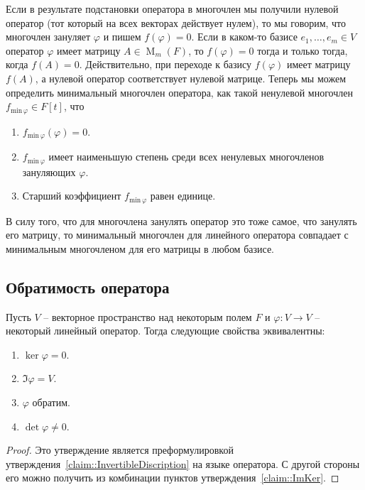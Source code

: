 Если в результате подстановки оператора в многочлен мы получили нулевой оператор (тот который на всех векторах действует нулем), то мы говорим, что многочлен зануляет $\varphi$ и пишем $f(\varphi) = 0$.
Если в каком-то базисе $e_1,\ldots,e_m\in V$ оператор $\varphi$ имеет матрицу $A\in \operatorname{M}_{m}(F)$, то $f(\varphi) = 0$ тогда и только тогда, когда $f(A) = 0$.
Действительно, при переходе к базису $f(\varphi)$ имеет матрицу $f(A)$, а нулевой оператор соответствует нулевой матрице.
Теперь мы можем определить минимальный многочлен оператора, как такой ненулевой многочлен $f_{\text{min}\,\varphi}\in F[t]$, что
\begin{enumerate}
\item $f_{\text{min}\,\varphi}(\varphi) = 0$.

\item $f_{\text{min}\,\varphi}$ имеет наименьшую степень среди всех ненулевых многочленов зануляющих $\varphi$.

\item Старший коэффициент $f_{\text{min}\,\varphi}$ равен единице.
\end{enumerate}
В силу того, что для многочлена занулять оператор это тоже самое, что занулять его матрицу, то минимальный многочлен для линейного оператора совпадает с минимальным многочленом для его матрицы в любом базисе.

\subsection{Обратимость оператора}

\begin{claim}
\label{claim::OperatorInvert}
Пусть $V$ -- векторное пространство над некоторым полем $F$ и $\varphi\colon V\to V$ -- некоторый линейный оператор.
Тогда следующие свойства эквивалентны:
\begin{enumerate}
\item $\ker \varphi = 0$.

\item $\Im \varphi = V$.

\item $\varphi$ обратим.

\item $\det \varphi \neq 0$.
\end{enumerate}
\end{claim}
\begin{proof}
Это утверждение является преформулировкой утверждения~\ref{claim::InvertibleDiscription} на языке оператора.
С другой стороны его можно получить из комбинации пунктов утверждения~\ref{claim::ImKer}.
\end{proof}

